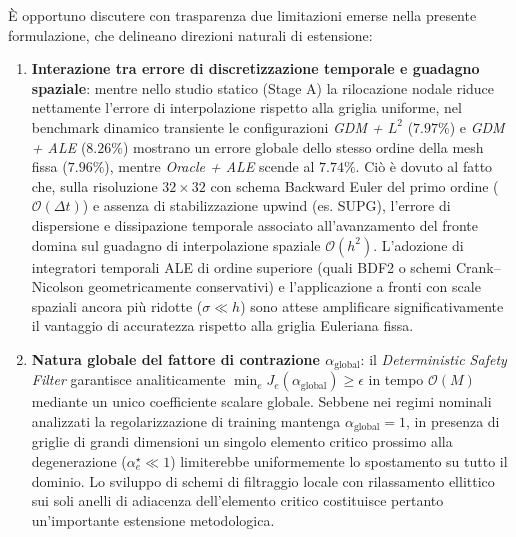 È opportuno discutere con trasparenza due limitazioni emerse nella presente formulazione, che delineano direzioni naturali di estensione:
\begin{enumerate}
    \item \textbf{Interazione tra errore di discretizzazione temporale e guadagno spaziale}: mentre nello studio statico (Stage A) la rilocazione nodale riduce nettamente l'errore di interpolazione rispetto alla griglia uniforme, nel benchmark dinamico transiente le configurazioni \textit{GDM + $L^2$} ($7.97\%$) e \textit{GDM + ALE} ($8.26\%$) mostrano un errore globale dello stesso ordine della mesh fissa ($7.96\%$), mentre \textit{Oracle + ALE} scende al $7.74\%$. Ciò è dovuto al fatto che, sulla risoluzione $32\times32$ con schema Backward Euler del primo ordine ($\mathcal{O}(\Delta t)$) e assenza di stabilizzazione upwind (es. SUPG), l'errore di dispersione e dissipazione temporale associato all'avanzamento del fronte domina sul guadagno di interpolazione spaziale $\mathcal{O}(h^2)$. L'adozione di integratori temporali ALE di ordine superiore (quali BDF2 o schemi Crank--Nicolson geometricamente conservativi) e l'applicazione a fronti con scale spaziali ancora più ridotte ($\sigma \ll h$) sono attese amplificare significativamente il vantaggio di accuratezza rispetto alla griglia Euleriana fissa.
    \item \textbf{Natura globale del fattore di contrazione $\alpha_{\mathrm{global}}$}: il \textit{Deterministic Safety Filter} garantisce analiticamente $\min_e J_e(\alpha_{\mathrm{global}}) \geq \epsilon$ in tempo $\mathcal{O}(M)$ mediante un unico coefficiente scalare globale. Sebbene nei regimi nominali analizzati la regolarizzazione di training mantenga $\alpha_{\mathrm{global}}=1$, in presenza di griglie di grandi dimensioni un singolo elemento critico prossimo alla degenerazione ($\alpha_e^\star \ll 1$) limiterebbe uniformemente lo spostamento su tutto il dominio. Lo sviluppo di schemi di filtraggio locale con rilassamento ellittico sui soli anelli di adiacenza dell'elemento critico costituisce pertanto un'importante estensione metodologica.
\end{enumerate}
